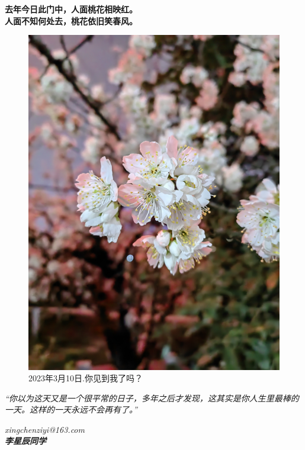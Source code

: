 \documentclass{article}
\begin{document}
\begin{center}
	{  \fontsize{16pt}{20pt}\selectfont \textbf{去年今日此门中，人面桃花相映红。\\人面不知何处去，桃花依旧笑春风。}}
\end{center}
\begin{figure}[H]
	\centering
	\includegraphics[width=15cm]{./img/index.png}%
	\caption{  2023年3月10日.你见到我了吗？} %
\end{figure}

\newpage
\emph{\large “你以为这天又是一个很平常的日子，多年之后才发现，这其实是你人生里最棒的一天。这样的一天永远不会再有了。” }

\vspace{1.5pt}
\noindent\hrulefill
\begin{flushright}
	\textit{xingchenziyi@163.com}
	\\\textit{\textbf{李星辰同学}}
\end{flushright}
\end{document}
